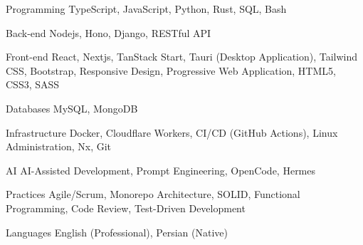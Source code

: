 

\begin{cvskills}

\cvskill
{Programming}
{TypeScript, JavaScript, Python, Rust, SQL, Bash}

\cvskill
{Back-end}
{Nodejs, Hono, Django, RESTful API}

\cvskill
{Front-end}
{React, Nextjs, TanStack Start, Tauri (Desktop Application), Tailwind CSS, Bootstrap, Responsive Design, Progressive Web Application, HTML5, CSS3, SASS}

\cvskill
{Databases}
{MySQL, MongoDB}

\cvskill
{Infrastructure}
{Docker, Cloudflare Workers, CI/CD (GitHub Actions), Linux Administration, Nx, Git}

\cvskill
{AI}
{AI-Assisted Development, Prompt Engineering, OpenCode, Hermes}

\cvskill
{Practices}
{Agile/Scrum, Monorepo Architecture, SOLID, Functional Programming, Code Review, Test-Driven Development}

\cvskill
{Languages}
{English (Professional), Persian (Native)}

\end{cvskills}
